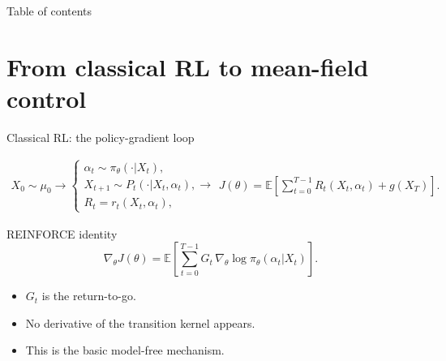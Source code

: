 \documentclass[9pt]{beamer}
\def\E{{\mathbb E}}
\begin{document}
\begin{frame}{Table of contents}
\tableofcontents
\end{frame}

\section{From classical RL to mean-field control}
\begin{frame}{Classical RL: the policy-gradient loop}
\begin{center}
\end{center}

\begin{align*}
  X_0 \sim \mu_0\longrightarrow
  \begin{cases}
    \alpha_t \sim \pi_\theta(\cdot|X_t),\\
    X_{t+1} \sim P_t(\cdot|X_t,\alpha_t),\longrightarrow\\
    R_t = r_t(X_t,\alpha_t),
  \end{cases}
  J(\theta) = \E\left[\sum_{t=0}^{T-1} R_t(X_t, \alpha_t) + g(X_T)\right].
\end{align*}

\begin{block}{REINFORCE identity \cite{williams1992reinforce}}
\[
  \nabla_\theta J(\theta)
  =\E\left[\sum_{t=0}^{T-1}G_t\,\nabla_\theta\log \pi_\theta(\alpha_t|X_t)\right].
\]
\end{block}
\begin{itemize}
  \item $G_t$ is the return-to-go.
  \item No derivative of the transition kernel appears.
  \item This is the basic model-free mechanism.
\end{itemize}
\end{frame}
\end{document}
